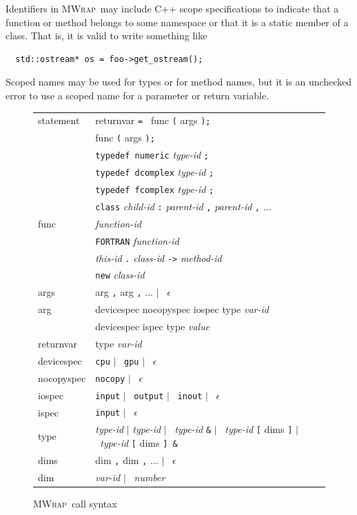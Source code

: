 \documentclass[12pt]{article}
\newcommand{\mwrap}{\textsc{MWrap}}
\newcommand{\gOR}{ $|$ }
\begin{document}
Identifiers in \mwrap\ may include C++ scope specifications to indicate
that a function or method belongs to some namespace or that it is a static
member of a class.  That is, it is valid to write something like
\begin{verbatim}
  std::ostream* os = foo->get_ostream();
\end{verbatim}
Scoped names may be used for types or for method names, but it is an
unchecked error to use a scoped name for a parameter or return
variable.

\begin{figure}
\begin{center}
\begin{tabular}{l@{ := }l}
  statement  & returnvar {\tt = } func {\tt (} args {\tt );} \\
             & func {\tt (}  args {\tt );} \\
             & {\tt typedef numeric} {\it type-id} {\tt ;} \\
             & {\tt typedef dcomplex} {\it type-id} {\tt ;} \\
             & {\tt typedef fcomplex} {\it type-id} {\tt ;} \\
             & {\tt class} {\it child-id} {\tt :}
               {\it parent-id} {\tt ,} {\it parent-id} {\tt ,} $\ldots$
\vspace{5mm} \\
  func       & {\it function-id} \\
             & {\tt FORTRAN} {\it function-id} \\
             & {\it this-id} {\tt .} {\it class-id} {\tt ->} {\it method-id}\\
             & {\tt new} {\it class-id}
\vspace{5mm} \\
  args       & arg {\tt ,} arg {\tt ,} $\ldots$ \gOR\ $\epsilon$ \\
  arg        & devicespec nocopyspec iospec type {\it var-id} \\
             & devicespec ispec  type {\it value} \\
  returnvar  & type {\it var-id}
\vspace{5mm} \\
  devicespec & {\tt cpu} \gOR\ {\tt gpu} \gOR\ $\epsilon$ \\
  nocopyspec & {\tt nocopy} \gOR\ $\epsilon$ \\
  iospec     & {\tt input} \gOR\ {\tt output} \gOR\ {\tt inout} \gOR\
               $\epsilon$ \\
  ispec      & {\tt input} \gOR\ $\epsilon$ \\
  type       & {\it type-id} \gOR 
               {\it type-id} {\tt *} \gOR\
               {\it type-id} {\tt \&} \gOR\
               {\it type-id} {\tt [} dims {\tt]} \gOR\
               {\it type-id} {\tt [} dims {\tt] \&} \\
  dims       & dim {\tt ,} dim {\tt ,} $\ldots$ \gOR\ $\epsilon$ \\
  dim        & {\it var-id} \gOR\ {\it number}
\end{tabular}
\caption{\mwrap\ call syntax}
\label{mwrap-syntax-fig}
\end{center}
\end{figure}
\end{document}
